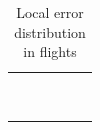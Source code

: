 \begin{table}[!ht]
\caption{\label{tab:local_errors_flights} Local error distribution in flights}
\centering
\begin{tabular}{r|K|P|D|K|K}
\toprule
{} &  &  &  &  &   \\ \midrule
{}             &         &     &              &    &                \\
             &         &     &              &    &                \\
             &         &           &              &       &                \\
             &         &           &              &       &                \\
             &         &           &              &       &                \\
             &         &           &              &       &                \\
             &         &           &              &       &                \\
 &  &   &  &  &  \\
 &  &  &  &  &  \\
\bottomrule
\end{tabular}
\end{table}

